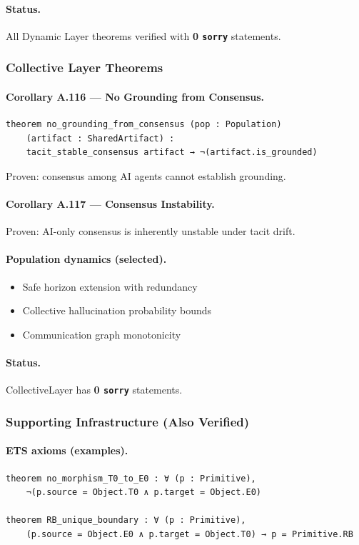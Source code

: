 \paragraph{Status.}
All Dynamic Layer theorems verified with \textbf{0 \texttt{sorry}} statements.

\subsubsection{Collective Layer Theorems \checkmark}
\paragraph{Corollary A.116 — No Grounding from Consensus.}
\begin{verbatim}
theorem no_grounding_from_consensus (pop : Population)
    (artifact : SharedArtifact) :
    tacit_stable_consensus artifact → ¬(artifact.is_grounded)
\end{verbatim}
Proven: consensus among AI agents cannot establish grounding.

\paragraph{Corollary A.117 — Consensus Instability.}
Proven: AI-only consensus is inherently unstable under tacit drift.

\paragraph{Population dynamics (selected).}
\begin{itemize}
  \item Safe horizon extension with redundancy \checkmark
  \item Collective hallucination probability bounds \checkmark
  \item Communication graph monotonicity \checkmark
\end{itemize}

\paragraph{Status.}
CollectiveLayer has \textbf{0 \texttt{sorry}} statements.

\subsubsection{Supporting Infrastructure (Also Verified)}
\paragraph{ETS axioms (examples).}
\begin{verbatim}
theorem no_morphism_T0_to_E0 : ∀ (p : Primitive),
    ¬(p.source = Object.T0 ∧ p.target = Object.E0)

theorem RB_unique_boundary : ∀ (p : Primitive),
    (p.source = Object.E0 ∧ p.target = Object.T0) → p = Primitive.RB
\end{verbatim}

